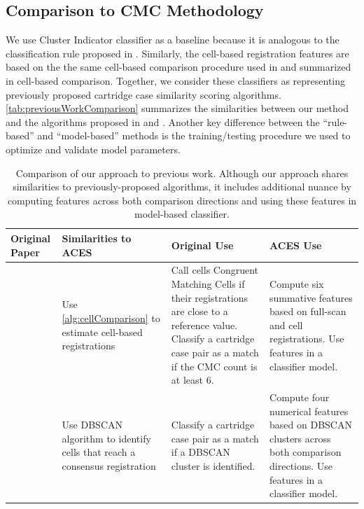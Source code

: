 \documentclass[reprint]{JASA}
\begin{document}
\hypertarget{comparison-to-cmc-methodology}{%
\subsection{Comparison to CMC
Methodology}\label{comparison-to-cmc-methodology}}

We use Cluster Indicator classifier as a baseline because it is
analogous to the classification rule proposed in
\citet{zhang_convergence_2021}. Similarly, the cell-based registration
features are based on the the same cell-based comparison procedure used
in \citet{song_proposed_2013} and summarized in cell-based comparison.
Together, we consider these classifiers as representing previously
proposed cartridge case similarity scoring algorithms.
\autoref{tab:previousWorkComparison} summarizes the similarities between
our method and the algorithms proposed in \citet{zhang_convergence_2021}
and \citet{song_proposed_2013}. Another key difference between the
``rule-based'' and ``model-based'' methods is the training/testing
procedure we used to optimize and validate model parameters.

\begin{table}[htbp]
\centering
\begin{tabular}{p{.18\linewidth} p{.23\linewidth} p{.23\linewidth} p{.23\linewidth}}
Original Paper & Similarities to ACES & Original Use & ACES Use \\
\hline
\citet{song_proposed_2013} & Use \autoref{alg:cellComparison} to estimate cell-based registrations & Call cells Congruent Matching Cells if their registrations are close to a reference value. Classify a cartridge case pair as a match if the CMC count is at least 6. & Compute six summative features based on full-scan and cell registrations. Use features in a classifier model. \\
\hline
\citet{zhang_convergence_2021} & Use DBSCAN algorithm to identify cells that reach a consensus registration & Classify a cartridge case pair as a match if a DBSCAN cluster is identified. & Compute four numerical features based on DBSCAN clusters across both comparison directions. Use features in a classifier model.
\end{tabular}
\caption{Comparison of our approach to previous work. Although our approach shares similarities to previously-proposed algorithms, it includes additional nuance by computing features across both comparison directions and using these features in model-based classifier.}
\label{tab:previousWorkComparison}
\end{table}
\end{document}
